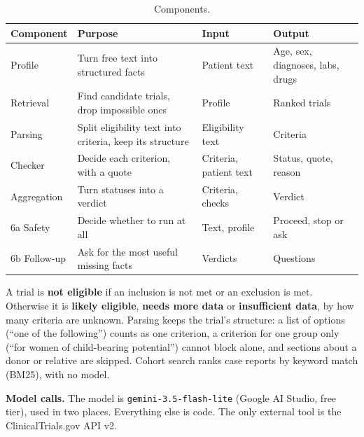 \documentclass[11pt,a4paper]{article}
\begin{document}
\begin{table}[!htb]
\centering
\small
\begin{tabular}{>{\raggedright\arraybackslash}p{2.5cm}>{\raggedright\arraybackslash}p{5.2cm}>{\raggedright\arraybackslash}p{3.2cm}>{\raggedright\arraybackslash}p{3.2cm}}
\toprule
Component & Purpose & Input & Output \\
\midrule
1 Profile & Turn free text into structured facts & Patient text & Age, sex, diagnoses, labs, drugs \\
2 Retrieval & Find candidate trials, drop impossible ones & Profile & Ranked trials \\
3 Parsing & Split eligibility text into criteria, keep its structure & Eligibility text & Criteria \\
4 Checker & Decide each criterion, with a quote & Criteria, patient text & Status, quote, reason \\
5 Aggregation & Turn statuses into a verdict & Criteria, checks & Verdict \\
6a Safety & Decide whether to run at all & Text, profile & Proceed, stop or ask \\
6b Follow-up & Ask for the most useful missing facts & Verdicts & Questions \\
\bottomrule
\end{tabular}
\caption{Components.}
\end{table}

A trial is \textbf{not eligible} if an inclusion is not met or an exclusion is met. Otherwise it is \textbf{likely eligible}, \textbf{needs more data} or \textbf{insufficient data}, by how many criteria are unknown. Parsing keeps the trial's structure: a list of options (``one of the following'') counts as one criterion, a criterion for one group only (``for women of child-bearing potential'') cannot block alone, and sections about a donor or relative are skipped. Cohort search ranks case reports by keyword match (BM25), with no model.

\textbf{Model calls.} The model is \texttt{gemini-3.5-flash-lite} (Google AI Studio, free tier), used in two places. Everything else is code. The only external tool is the ClinicalTrials.gov API v2.
\end{document}
